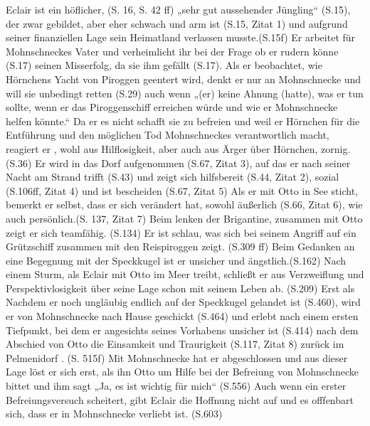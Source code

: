 Eclair ist ein höflicher, (S. 16, S. 42 ff) „sehr gut aussehender Jüngling“ (S.15), der zwar gebildet, aber eher schwach und arm ist (S.15, Zitat 1) und aufgrund seiner finanziellen Lage sein Heimatland verlassen musste.(S.15f) Er arbeitet für Mohnschneckes Vater und verheimlicht ihr bei der Frage ob er rudern könne (S.17) seinen Misserfolg, da sie ihm gefällt (S.17). Als er beobachtet, wie Hörnchens Yacht von Piroggen geentert wird, denkt er nur an Mohnschnecke und will sie unbedingt retten (S.29) auch wenn „(er) keine Ahnung (hatte), was er tun sollte, wenn er das Piroggenschiff erreichen würde und wie er Mohnschnecke helfen könnte.“ Da er es nicht schafft sie zu befreien und weil er Hörnchen für die Entführung und den möglichen Tod Mohnschneckes verantwortlich macht, reagiert er , wohl aus Hilflosigkeit, aber auch aus Ärger über Hörnchen, zornig. (S.36) Er wird in das Dorf aufgenommen (S.67, Zitat 3), auf das er nach seiner Nacht am Strand trifft (S.43) und zeigt sich hilfsbereit (S.44, Zitat 2), sozial (S.106ff, Zitat 4) und ist bescheiden (S.67, Zitat 5) Als er mit Otto in See sticht, bemerkt er selbst, dass er sich verändert hat, sowohl äußerlich (S.66, Zitat 6), wie auch persönlich.(S. 137, Zitat 7) Beim lenken der Brigantine, zusammen mit Otto zeigt er sich teamfähig. (S.134) Er ist schlau, was sich bei seinem Angriff auf ein Grützschiff zusammen mit den Reispiroggen zeigt. (S.309 ff) Beim Gedanken an eine Begegnung mit der Speckkugel ist er  unsicher und ängstlich.(S.162) Nach einem Sturm, als Eclair mit Otto im Meer treibt, schließt er aus Verzweiflung und Perspektivlosigkeit über seine Lage schon mit seinem Leben ab. (S.209) Erst als Nachdem er noch ungläubig endlich auf der Speckkugel gelandet ist (S.460), wird er von Mohnschnecke nach Hause geschickt (S.464) und erlebt  nach einem ersten Tiefpunkt, bei dem er angesichts seines Vorhabens unsicher ist (S.414) nach dem Abschied von Otto die Einsamkeit und Traurigkeit (S.117, Zitat 8) zurück im Pelmenidorf . (S. 515f) Mit Mohnschnecke hat er abgeschlossen und aus dieser Lage löst er sich erst, als ihn Otto um Hilfe bei der Befreiung von Mohnschnecke bittet und ihm sagt „Ja, es ist wichtig für mich“ (S.556) Auch wenn ein erster Befreiungsversuch scheitert, gibt Eclair die Hoffnung nicht auf und es offfenbart sich, dass er in Mohnschnecke verliebt ist. (S.603)

